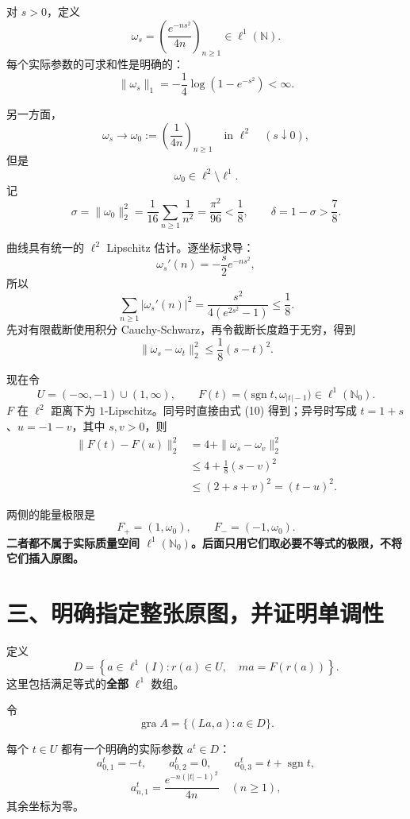 \documentclass[UTF8,fontset=fandol,11pt,a4paper]{ctexart}
\begin{document}
对 $s>0$，定义 \[
\omega_s
=
\left(\frac{e^{-ns^2}}{4n}\right)_{n\ge1}
\in\ell^1(\mathbb N).
\tag{7}
\] 每个实际参数的可求和性是明确的： \[
\|\omega_s\|_1
=-\frac14\log(1-e^{-s^2})<\infty.
\]

另一方面， \[
\omega_s\longrightarrow
\omega_0:=\left(\frac1{4n}\right)_{n\ge1}
\quad\text{in }\ell^2
\quad(s\downarrow0),
\] 但是 \[
\boxed{\omega_0\in\ell^2\setminus\ell^1.}
\tag{8}
\] 记 \[
\sigma=\|\omega_0\|_2^2
=\frac1{16}\sum_{n\ge1}\frac1{n^2}
=\frac{\pi^2}{96}<\frac18,
\qquad
\delta=1-\sigma>\frac78.
\tag{9}
\]

曲线具有统一的 $\ell^2$ Lipschitz 估计。逐坐标求导： \[
\omega_s'(n)=-\frac{s}{2}e^{-ns^2},
\] 所以 \[
\sum_{n\ge1}|\omega_s'(n)|^2
=
\frac{s^2}{4(e^{2s^2}-1)}
\le\frac18.
\] 先对有限截断使用积分 Cauchy-Schwarz，再令截断长度趋于无穷，得到 \[
\boxed{
\|\omega_s-\omega_t\|_2^2\le\frac18(s-t)^2.
}
\tag{10}
\]

现在令 \[
U=(-\infty,-1)\cup(1,\infty),
\qquad
F(t)=\bigl(\operatorname{sgn}t,\omega_{|t|-1}\bigr)
\in\ell^1(\mathbb N_0).
\tag{11}
\] $F$ 在 $\ell^2$ 距离下为 $1$-Lipschitz。同号时直接由式 (10) 得到；异号时写成 $t=1+s$、$u=-1-v$，其中 $s,v>0$，则 \[
\begin{aligned}
\|F(t)-F(u)\|_2^2
&=4+\|\omega_s-\omega_v\|_2^2\\
&\le4+\frac18(s-v)^2\\
&\le(2+s+v)^2=(t-u)^2.
\end{aligned}
\tag{12}
\]

两侧的能量极限是 \[
F_+=(1,\omega_0),\qquad F_-=(-1,\omega_0).
\tag{13}
\] \textbf{二者都不属于实际质量空间 $\ell^1(\mathbb N_0)$。后面只用它们取必要不等式的极限，不将它们插入原图。}

\section{三、明确指定整张原图，并证明单调性}\label{ux4e09ux660eux786eux6307ux5b9aux6574ux5f20ux539fux56feux5e76ux8bc1ux660eux5355ux8c03ux6027}

定义 \[
D=
\left\{
a\in\ell^1(I):
r(a)\in U,\quad ma=F(r(a))
\right\}.
\tag{14}
\] 这里包括满足等式的\textbf{全部} $\ell^1$ 数组。

令 \[
\boxed{
\operatorname{gra}A=\{(La,a):a\in D\}.
}
\tag{15}
\]

每个 $t\in U$ 都有一个明确的实际参数 $a^t\in D$： \[
a^t_{0,1}=-t,\qquad
a^t_{0,2}=0,\qquad
a^t_{0,3}=t+\operatorname{sgn}t,
\] \[
a^t_{n,1}
=\frac{e^{-n(|t|-1)^2}}{4n}
\quad(n\ge1),
\] 其余坐标为零。
\end{document}
